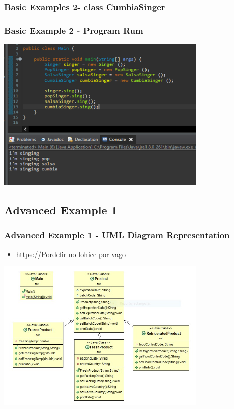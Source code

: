 \documentclass[11pt]{beamer}
\begin{document}
\begin{frame}
\frametitle{Basic Examples 2- class CumbiaSinger}

\end{frame}

\begin{frame}
\frametitle{Basic Example 2 - Program Rum}
\begin{center}
{\includegraphics[width=10.0cm]{img/RunBasic1.png}}
\end{center}
\end{frame}



\begin{frame}
\section{Advanced Example 1}
\frametitle{Advanced Example 1 - UML Diagram Representation}
\begin{itemize}
\item \url{https://Pordefir no lohice por vago}
\end{itemize}
\begin{center}
{\includegraphics[width=10.0cm]{img/UmlAdvanced1.jpeg}}
\end{center}
\end{frame}
\end{document}
